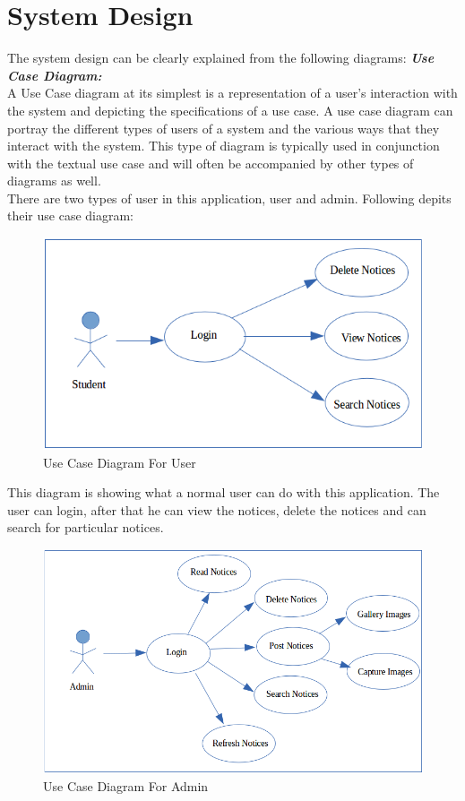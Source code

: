 \section{System Design}
The system design can be clearly explained from the following diagrams:
\textbf{\emph{Use Case Diagram:}}\\

A Use Case diagram at its simplest is a representation of a user's interaction with the system and depicting the specifications of a use case. A use case diagram can portray the different types of users of a system and the various ways that they interact with the system. This type of diagram is typically used in conjunction with the textual use case and will often be accompanied by other types of diagrams as well.
\\
There are two types of user in this application, user and admin. Following depits their use case diagram:

\begin{figure}[H]
\centering \includegraphics[scale=0.5]{image/usecase1.png}
\caption{Use Case Diagram For User}
\end{figure}

This diagram is showing what a normal user can do with this application. The user can login, after that he can view the notices, delete the notices and can search for particular notices.

\begin{figure}[H]
\centering \includegraphics[scale=0.5]{image/usecase2.png}
\caption{Use Case Diagram For Admin}
\end{figure}

